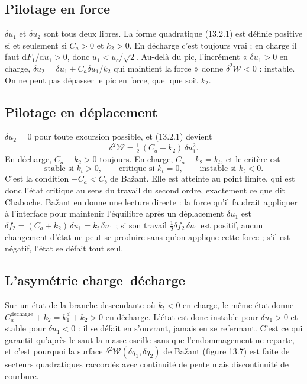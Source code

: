 \documentclass[11pt,a4paper]{article}
\newcommand{\dd}{\mathrm{d}}
\newcommand{\kd}{k_1^{d}}
\newcommand{\uc}{u_c}
\newcommand{\dW}{\delta^2\mathcal W}
\begin{document}
\subsection{Pilotage en force}
$\delta u_1$ et $\delta u_2$ sont tous deux libres. La forme quadratique (13.2.1) est définie
positive si et seulement si $C_a > 0$ et $k_2 > 0$. En décharge c'est toujours vrai ; en charge
il faut $\dd F_1/\dd u_1 > 0$, donc $u_1 < \uc/\sqrt2$. Au-delà du pic, l'incrément « $\delta u_1 > 0$
en charge, $\delta u_2 = \delta u_1 + C_a\delta u_1/k_2$ qui maintient la force » donne $\dW < 0$ :
instable. On ne peut pas dépasser le pic en force, quel que soit $k_2$.

\subsection{Pilotage en déplacement}
$\delta u_2 = 0$ pour toute excursion possible, et (13.2.1) devient
\begin{equation}
  \dW = \tfrac12\,(C_a + k_2)\,\delta u_1^2 .
  \tag{13.2.2}
\end{equation}
En décharge, $C_a + k_2 > 0$ toujours. En charge, $C_a + k_2 = k_t$, et le critère est
\begin{equation}
  \text{stable si } k_t > 0,\qquad \text{critique si } k_t = 0,\qquad \text{instable si } k_t < 0 .
  \tag{13.2.3}
\end{equation}
C'est la condition $-C_a < C_b$ de Bažant. Elle est atteinte au point limite, qui est donc l'état
critique au sens du travail du second ordre, exactement ce que dit Chaboche. Bažant en donne une
lecture directe : la force qu'il faudrait appliquer à l'interface pour maintenir l'équilibre
après un déplacement $\delta u_1$ est $\delta f_2 = (C_a + k_2)\,\delta u_1 = k_t\,\delta u_1$ ; si son
travail $\tfrac12\delta f_2\,\delta u_1$ est positif, aucun changement d'état ne peut se produire
sans qu'on applique cette force ; s'il est négatif, l'état se défait tout seul.

\subsection{L'asymétrie charge--décharge}
Sur un état de la branche descendante où $k_t < 0$ en charge, le même état donne
$C_a^{\text{décharge}} + k_2 = \kd + k_2 > 0$ en décharge. L'état est donc instable pour
$\delta u_1 > 0$ et stable pour $\delta u_1 < 0$ : il se défait en s'ouvrant, jamais en se
refermant. C'est ce qui garantit qu'après le saut la masse oscille sans que l'endommagement
ne reparte, et c'est pourquoi la surface $\dW(\delta q_1,\delta q_2)$ de Bažant (figure 13.7)
est faite de secteurs quadratiques raccordés avec continuité de pente mais discontinuité de
courbure.
\end{document}
